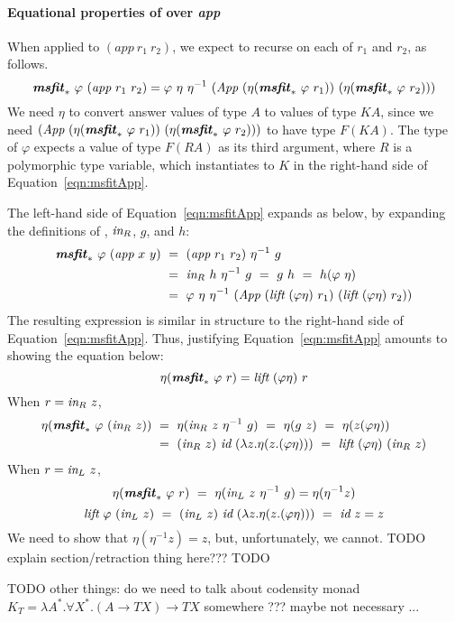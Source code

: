 \paragraph*{Equational properties of \msfit{*} over \textit{app}}
When applied to $(\textit{app}~r_1~r_2)$, we expect \msfit{*} to
recurse on each of $r_1$ and $r_2$, as follows.
\begin{equation} \textbf{\textit{msfit}}_{*}~\varphi~(\textit{app}~r_1~r_2)
= \varphi~\eta~\eta^{-1}~(\textit{App}~(\eta(\textbf{\textit{msfit}}_{*}~\varphi~r_1))
					~(\eta(\textbf{\textit{msfit}}_{*}~\varphi~r_2)))
\label{eqn:msfitApp}
\end{equation}
We need $\eta$ to convert answer values of type $A$ to values of type $KA$,
since we need $(\textit{App}~(\eta(\textbf{\textit{msfit}}_{*}~\varphi~r_1))
					~(\eta(\textbf{\textit{msfit}}_{*}~\varphi~r_2)))$
to have type $F(KA)$. The type of $\varphi$ expects a value of type $F(RA)$
as its third argument, where $R$ is a polymorphic type variable, which
instantiates to $K$ in the right-hand side of Equation~\ref{eqn:msfitApp}.

The left-hand side of Equation~\ref{eqn:msfitApp} expands as below,
by expanding the definitions of \msfit{*}, $\textit{in}_{R}$, $g$, and  $h$:
\begin{align*}
\textbf{\textit{msfit}}_{*}~\varphi~(\textit{app}~x~y)
&~=~ (\textit{app}~r_1~r_2)~\eta^{-1}~g \\
&~=~ \textit{in}_{R}~h~\eta^{-1}~g ~=~ g~h ~=~ h(\varphi~\eta) \\
&~=~ \varphi~\eta~\eta^{-1}
     ~(\textit{App}~(\textit{lift}~(\varphi\eta)~r_1)~(\textit{lift}~(\varphi\eta)~r_2))
\end{align*}
The resulting expression is similar in structure to the right-hand side of
Equation~\ref{eqn:msfitApp}. Thus, justifying Equation~\ref{eqn:msfitApp}
amounts to showing the equation below:
\begin{equation}
\eta(\textbf{\textit{msfit}}_{*}~\varphi~r) = \textit{lift}~(\varphi\eta)~r
\label{eqn:msfitLift}
\end{equation}
When $r = \textit{in}_{R}~z$,
\begin{align*}
\eta(\textbf{\textit{msfit}}_{*}~\varphi~(\textit{in}_{R}~z))
&~=~ \eta(\textit{in}_{R}~z~\eta^{-1}~g) ~=~ \eta(g~z) ~=~ \eta(z(\varphi\eta)) \\
&~=~ (\textit{in}_{R}~z)~\textit{id}~(\lambda z.\eta(z.(\varphi\eta)))
 ~=~ \textit{lift}~(\varphi\eta)~(\textit{in}_{R}~z)
\end{align*}
When $r = \textit{in}_{L}~z$,
\[ \eta(\textbf{\textit{msfit}}_{*}~\varphi~r) ~=~\eta(\textit{in}_{L}~z~\eta^{-1}~g) = \eta(\eta^{-1}z)
\]
\[ \textit{lift}~\varphi~(\textit{in}_{L}~z)
   ~=~ (\textit{in}_{L}~z)~\textit{id}~(\lambda z.\eta(z.(\varphi\eta)))
   ~=~ \textit{id}~z = z
\]
We need to show that $\eta(\eta^{-1}z) = z$, but, unfortunately, we cannot.
TODO explain section/retraction thing here??? TODO




TODO other things: do we need to talk about codensity monad
$K_T = \lambda A^{*}.\forall X^{*}.(A \to T X) \to T X$
somewhere ??? maybe not necessary ...


